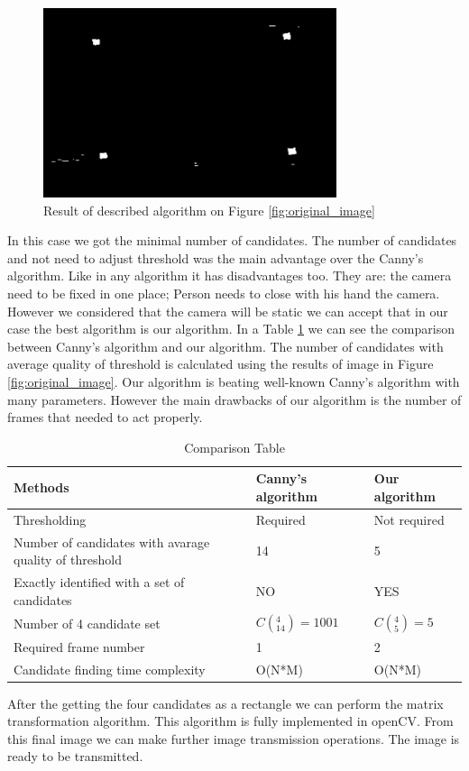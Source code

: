 \begin{figure}[h]
    \centering
    \includegraphics{Figures/after_taking_difference}
    \caption{Result of described algorithm on Figure \ref{fig:original_image}}
    \label{fig:after_taking_difference}
\end{figure}


In this case we got the minimal number of candidates. The number of candidates and not need to adjust threshold was the main advantage over the Canny’s algorithm. Like in any algorithm it has disadvantages too. They are: the camera need to be fixed in one place; Person needs to close with his hand the camera. However we considered that the camera will be static we can accept that in our case the best algorithm is our algorithm. In a Table \ref{tab:comparison_table} we can see the comparison between Canny’s algorithm and our algorithm. The number of candidates with average quality of threshold is calculated using the results of image in Figure \ref{fig:original_image}. Our algorithm is beating well-known Canny’s algorithm with many parameters. However the main drawbacks of our algorithm is the number of frames that needed to act properly.

\begin{longtable}[t]{|p{}|p{}|p{}|}
\caption{Comparison Table}\label{tab:comparison_table} \\
	\hline
	\textbf{Methods} & \textbf{Canny's algorithm} & \textbf{Our algorithm} \\
	\hline
	\endhead
	Thresholding 
	& Required
	& Not required\\
	\hline
	Number of candidates with avarage quality of threshold 
	& 14
	& 5 \\
	\hline
	Exactly identified with a set of candidates 
	& NO
	& YES\\
	\hline
	Number of 4 candidate set 
	& $C(_{14}^4) = 1001$
	& $C(_5^4) = 5$\\
	\hline
	Required frame number 
	& 1
	& 2\\
	\hline
	Candidate finding time complexity 
	& O(N*M)
	& O(N*M)\\
	\hline
\end{longtable}

After the getting the four candidates as a rectangle we can perform the matrix transformation algorithm. This algorithm is fully implemented in openCV. From this final image we can make further image transmission operations. The image is ready to be transmitted. 